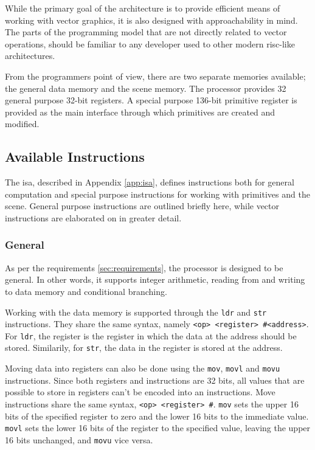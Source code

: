 While the primary goal of the \vthreek architecture is to provide efficient means of working with vector graphics, it is also designed with approachability in mind.
The parts of the programming model that are not directly related to vector operations, should be familiar to any developer used to other modern \gls{risc}-like architectures.

From the programmers point of view, there are two separate memories available; the general data memory and the scene memory.
The processor provides 32 general purpose 32-bit registers.
A special purpose 136-bit primitive register is provided as the main interface through which primitives are created and modified.

\subsection{Available Instructions}

The \vthreek \gls{isa}, described in Appendix \ref{app:isa}, defines instructions both for general computation and special purpose instructions for working with primitives and the scene.
General purpose instructions are outlined briefly here, while vector instructions are elaborated on in greater detail.

\subsubsection{General}

As per the requirements \ref{sec:requirements}, the \vthreek processor is designed to be general.
In other words, it supports integer arithmetic, reading from and writing to data memory and conditional branching.

Working with the data memory is supported through the \texttt{ldr} and \texttt{str} instructions.
They share the same syntax, namely \texttt{<op> <register> \#<address>}.
For \texttt{ldr}, the register is the register in which the data at the address should be stored.
Similarily, for \texttt{str}, the data in the register is stored at the address.

Moving data into registers can also be done using the \texttt{mov}, \texttt{movl} and \texttt{movu} instructions.
Since both registers and instructions are 32 bits, all values that are possible to store in registers can't be encoded into an instructions.
Move instructions share the same syntax, \texttt{<op> <register> \#<16-bit immediate>}.
\texttt{mov} sets the upper 16 bits of the specified register to zero and the lower 16 bits to the immediate value.
\texttt{movl} sets the lower 16 bits of the register to the specified value, leaving the upper 16 bits unchanged, and \texttt{movu} vice versa.

